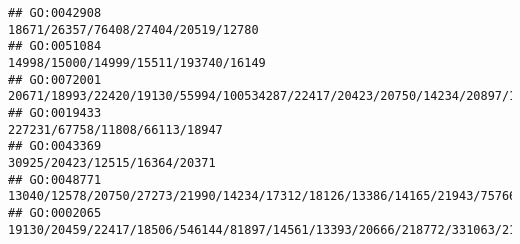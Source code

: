 \documentclass[
]{article}
\begin{document}
\begin{verbatim}
## GO:0042908                                                                                                                                                                                                                                                                                                                                                                          18671/26357/76408/27404/20519/12780
## GO:0051084                                                                                                                                                                                                                                                                                                                                                                         14998/15000/14999/15511/193740/16149
## GO:0072001                                                                                                                                                                                                                                                                     20671/18993/22420/19130/55994/100534287/22417/20423/20750/14234/20897/14561/20666/20474/14165/218772/18095/15117/22270/19876/14585/12705
## GO:0019433                                                                                                                                                                                                                                                                                                                                                                               227231/67758/11808/66113/18947
## GO:0043369                                                                                                                                                                                                                                                                                                                                                                                30925/20423/12515/16364/20371
## GO:0048771                                                                                                                                                                                                                                                                                                                    13040/12578/20750/27273/21990/14234/17312/18126/13386/14165/21943/75766/22337/21380/17986
## GO:0002065                                                                                                                                                                                                                                                                                                                                   19130/20459/22417/18506/546144/81897/14561/13393/20666/218772/331063/21380

\end{verbatim}
\end{document}
